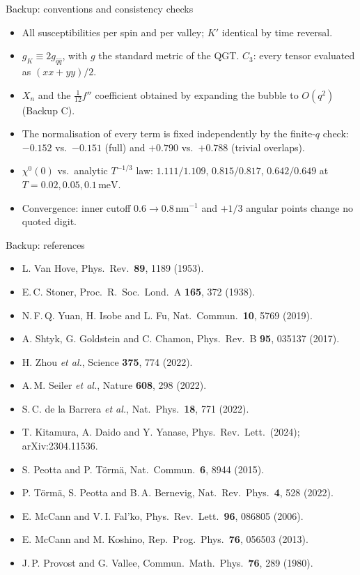 \documentclass[aspectratio=169,11pt]{beamer}
\newcommand{\meV}{\,\mathrm{meV}}
\newcommand{\nm}{\,\mathrm{nm}}
\begin{document}
\begin{frame}{Backup: conventions and consistency checks}
\small
\begin{itemize}\setlength{\itemsep}{5pt}
\item All susceptibilities per spin and per valley; $K'$ identical by time reversal.
\item $g_K\equiv2g_{\hat q\hat q}$, with $g$ the standard metric of the QGT. $C_3$: every tensor evaluated as $(xx+yy)/2$.
\item $X_n$ and the $\tfrac1{12}f''$ coefficient obtained by expanding the bubble to $O(q^2)$ (Backup C).
\item The normalisation of every term is fixed independently by the finite-$q$ check:
      $-0.152$ vs.\ $-0.151$ (full) and $+0.790$ vs.\ $+0.788$ (trivial overlaps).
\item $\chi^0(0)$ vs.\ analytic $T^{-1/3}$ law: $1.111/1.109$, $0.815/0.817$, $0.642/0.649$ at $T=0.02,0.05,0.1\meV$.
\item Convergence: inner cutoff $0.6\to0.8\nm^{-1}$ and $+1/3$ angular points change no quoted digit.
\end{itemize}
\end{frame}


\begin{frame}{Backup: references}
\scriptsize
\begin{itemize}\setlength{\itemsep}{3pt}
\item L. Van Hove, Phys.\ Rev.\ \textbf{89}, 1189 (1953).
\item E.\,C. Stoner, Proc.\ R.\ Soc.\ Lond.\ A \textbf{165}, 372 (1938).
\item N.\,F.\,Q. Yuan, H. Isobe and L. Fu, Nat.\ Commun.\ \textbf{10}, 5769 (2019).
\item A. Shtyk, G. Goldstein and C. Chamon, Phys.\ Rev.\ B \textbf{95}, 035137 (2017).
\item H. Zhou \emph{et al.}, Science \textbf{375}, 774 (2022).
\item A.\,M. Seiler \emph{et al.}, Nature \textbf{608}, 298 (2022).
\item S.\,C. de la Barrera \emph{et al.}, Nat.\ Phys.\ \textbf{18}, 771 (2022).
\item T. Kitamura, A. Daido and Y. Yanase, Phys.\ Rev.\ Lett.\ (2024); arXiv:2304.11536.
\item S. Peotta and P. T\"orm\"a, Nat.\ Commun.\ \textbf{6}, 8944 (2015).
\item P. T\"orm\"a, S. Peotta and B.\,A. Bernevig, Nat.\ Rev.\ Phys.\ \textbf{4}, 528 (2022).
\item E. McCann and V.\,I. Fal'ko, Phys.\ Rev.\ Lett.\ \textbf{96}, 086805 (2006).
\item E. McCann and M. Koshino, Rep.\ Prog.\ Phys.\ \textbf{76}, 056503 (2013).
\item J.\,P. Provost and G. Vallee, Commun.\ Math.\ Phys.\ \textbf{76}, 289 (1980).
\end{itemize}
\end{frame}
\end{document}

